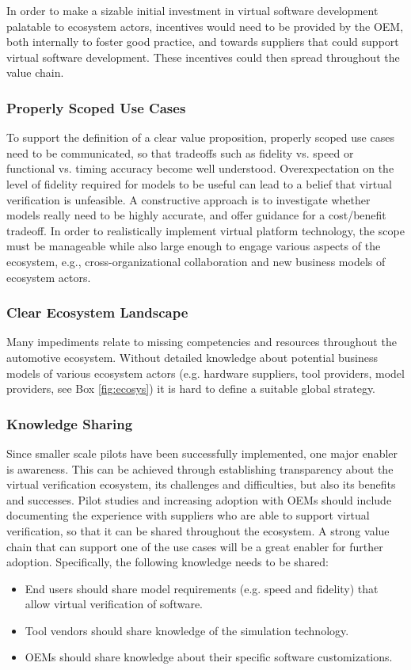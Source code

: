 In order to make a sizable initial investment in virtual software development palatable to ecosystem actors,
incentives would need to be provided by the OEM,
both internally to foster good practice, and towards suppliers that could support virtual software development.
These incentives could then spread throughout the value chain.

\subsubsection*{Properly Scoped Use Cases}
To support the definition of a clear value proposition,
properly scoped use cases need to be communicated, so that tradeoffs such as fidelity vs. speed or functional vs. timing accuracy become well understood.
Overexpectation on the level of fidelity required for models to be useful can lead to a belief that virtual verification is unfeasible.
A constructive approach is to investigate whether models really need to be highly accurate, and offer guidance for a cost/benefit tradeoff.
In order to realistically implement virtual platform technology,
the scope must be manageable
while also large enough to engage various aspects of the ecosystem,
e.g., cross-organizational collaboration and new business models of ecosystem actors.

\subsubsection*{Clear Ecosystem Landscape}
Many impediments relate to missing competencies and resources throughout the automotive ecosystem. 
Without detailed knowledge about potential business models of various ecosystem actors (e.g. hardware suppliers, tool providers, model providers, see Box \ref{fig:ecosys}) it is hard to define a suitable global strategy. 



\subsubsection*{Knowledge Sharing}
Since smaller scale pilots have been successfully implemented, one major enabler is awareness.
This can be achieved through establishing transparency about the virtual verification ecosystem, its challenges and difficulties, but also its benefits and successes. 
Pilot studies and increasing adoption with OEMs should include documenting the experience with suppliers who are able to support virtual verification,
so that it can be shared throughout the ecosystem.
A strong value chain that can support one of the use cases will be a great enabler for further adoption.
Specifically, the following knowledge needs to be shared:
\begin{itemize}
  \item End users should share model requirements (e.g. speed and fidelity) that allow virtual verification of software.
  \item Tool vendors should share knowledge of the simulation technology.
  \item OEMs should share knowledge about their specific software customizations.
\end{itemize}